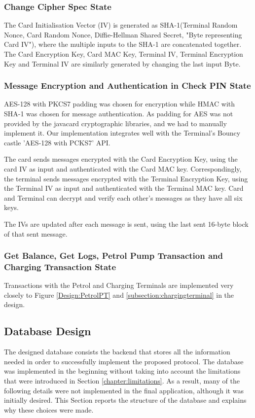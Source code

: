 \documentclass[a4paper,10pt]{llncs}
\begin{document}
\subsubsection{Change Cipher Spec State}
The Card Initialisation Vector (IV) is generated as SHA-1(Terminal Random Nonce, Card Random Nonce, Diffie-Hellman Shared Secret, "Byte representing Card IV"), where the multiple inputs to the SHA-1 are concatenated together. The Card Encryption Key, Card MAC Key, Terminal IV, Terminal Encryption Key and Terminal IV are similarly generated by changing the last input Byte.

\subsubsection{Message Encryption and Authentication in Check PIN State}
AES-128 with PKCS7 padding was chosen for encryption while HMAC with SHA-1 was chosen for message authentication. As padding for AES was not provided by the javacard cryptographic libraries, and we had to manually implement it. Our implementation integrates well with the Terminal's Bouncy castle 'AES-128 with PCKS7' API.

The card sends messages encrypted with the Card Encryption Key, using the card IV as input and authenticated with the Card MAC key. Correspondingly, the terminal sends messages encrypted with the Terminal Encryption Key, using the Terminal IV as input and authenticated with the Terminal MAC key. Card and Terminal can decrypt and verify each other's messages as they have all six keys.

The IVs are updated after each message is sent, using the last sent 16-byte block of that sent message.

\subsubsection{Get Balance, Get Logs, Petrol Pump Transaction and Charging Transaction State}
Transactions with the Petrol and Charging Terminals are implemented very closely to Figure \ref{Design:PetrolPT} and \ref{subsection:chargingterminal} in the design.


\subsection{Database Design}

The designed database consists the backend that stores all the information needed in order to successfully implement the proposed 
protocol. The database was implemented in the beginning without taking into account the limitations that were introduced in 
Section \ref{chapter:limitations}. As a result, many of the following details were not implemented in the final application, 
although it was initially desired. This Section reports the structure of the database and explains why these choices were made.
\end{document}
